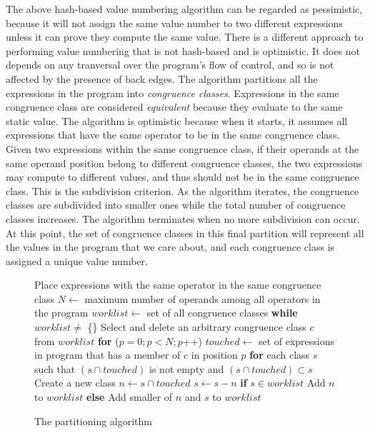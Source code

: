 The above hash-based value numbering algorithm can be regarded as pessimistic, 
because it will not assign the same value number to two different expressions 
unless it can prove they compute the same value.  There is a different approach
to performing value numbering that is not hash-based and is optimistic.
It does not depends on any tranversal over the program's flow of control, and
so is not affected by the presence of back edges.  The algorithm partitions 
all the expressions in the program into \emph{congruence classes}.  Expressions
in the same congruence class are considered \emph{equivalent} because they
evaluate to the same static value.  The algorithm is optimistic because  
when it starts, it assumes all expressions that have the same operator to be
in the same congruence class.  
Given two expressions within the same congruence class, if 
their operands at the same operand position belong to different congruence
classes, the two expressions may compute to different values, and thus should
not be in the same congruence class.  This is the subdivision 
criterion.  As the algorithm iterates, the congruence classes are subdivided
into smaller ones while the total number of congruence classes increases.
The algorithm terminates when no more subdivision can occur.  At this point,
the set of congruence classes in this final partition will represent all the
values in the program that we care about, and each congruence class is assigned
a unique value number.  

\begin{figure}[t]
\setcounter{linectr}{0}
\centering
\begin{minipage}[t]{6in}
\begin{code}
 Place expressions with the same operator in the same congruence class
 $N \leftarrow$ maximum number of operands among all operators in the program
 $worklist \leftarrow$ set of all congruence classes
 {\bf while} $worklist \neq$ \{\} 
    Select and delete an arbitrary congruence class $c$ from $worklist$
    {\bf for} ($p = 0; p < N; p$++)
      $touched \leftarrow$ set of expressions in program that has a member of $c$ in position $p$
      {\bf for} each class $s$ such that $(s \cap touched)$ is not empty and $(s \cap touched) \subset s$
        Create a new class $n \leftarrow s \cap touched$
        $s \leftarrow s - n$
        {\bf if} $s \in worklist$
           Add $n$ to $worklist$
        {\bf else}
           Add smaller of $n$ and $s$ to $worklist$
\end{code}
\end{minipage}
\caption{The partitioning algorithm}
\label{fig:partition-alg}
\end{figure}

